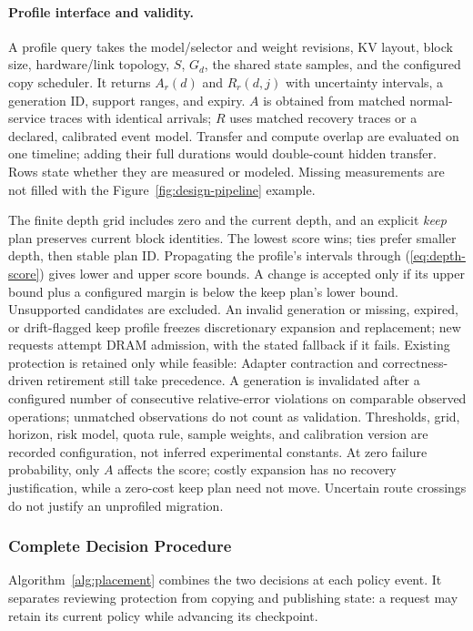 \paragraph{Profile interface and validity.}
A profile query takes the model/selector and weight revisions, KV layout,
block size, hardware/link topology, $S$, $G_d$, the shared state samples,
and the configured copy scheduler. It returns $A_r(d)$ and $R_r(d,j)$
with uncertainty intervals, a generation ID, support ranges, and expiry.
$A$ is obtained from matched normal-service traces with identical arrivals;
$R$ uses matched recovery traces or a declared, calibrated event model.
Transfer and compute overlap are evaluated on one timeline; adding their
full durations would double-count hidden transfer. Rows state whether
they are measured or modeled. Missing measurements are not filled with
the Figure~\ref{fig:design-pipeline} example.

The finite depth grid includes zero and the current depth, and an explicit
\emph{keep} plan preserves current block identities. The lowest score wins;
ties prefer smaller depth, then stable plan ID. Propagating the profile's
intervals through (\ref{eq:depth-score}) gives lower and upper score bounds.
A change is accepted only if its upper bound plus a configured margin
is below the keep plan's lower bound. Unsupported candidates are excluded.
An invalid generation or missing, expired, or drift-flagged keep profile
freezes discretionary expansion and replacement; new requests attempt
DRAM admission, with the stated fallback if it fails.
Existing protection is retained only while feasible:
Adapter contraction and correctness-driven retirement still take precedence.
A generation is invalidated after a configured number of consecutive
relative-error violations on comparable observed operations; unmatched
observations do not count as validation. Thresholds, grid, horizon,
risk model, quota rule, sample weights, and calibration version are
recorded configuration, not inferred experimental constants.
At zero failure probability, only $A$ affects the score; costly expansion
has no recovery justification, while a zero-cost keep plan need not move.
Uncertain route crossings do not justify an unprofiled migration.

\subsubsection{Complete Decision Procedure}
\label{sec:kv-master-procedure}

Algorithm~\ref{alg:placement} combines the two decisions at each policy
event. It separates reviewing protection from copying and publishing state:
a request may retain its current policy while advancing its checkpoint.

